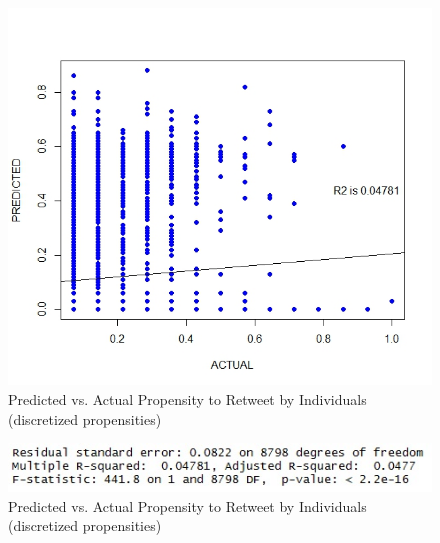 \begin{figure}
\includegraphics[scale=0.4]{PredictedvActual}
\caption{Predicted vs. Actual Propensity to Retweet by Individuals (discretized propensities)}
\end{figure}
\begin{figure}
\includegraphics[scale=0.7]{R2_results}
\caption{Predicted vs. Actual Propensity to Retweet by Individuals (discretized propensities)}
\end{figure}
